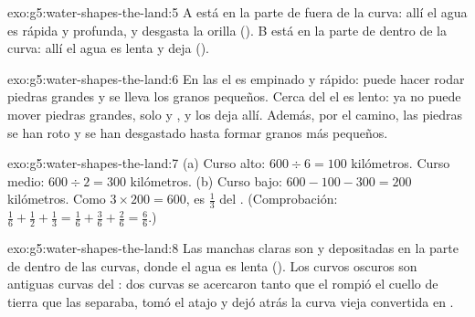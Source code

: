 \begin{solution}{exo:g5:water-shapes-the-land:5}
A está en la parte de fuera de la curva: allí el agua es rápida y profunda,
y desgasta la orilla (). B está en la parte de dentro de la curva:
allí el agua es lenta y deja  ().
\end{solution}

\begin{solution}{exo:g5:water-shapes-the-land:6}
En las  el  es empinado y rápido: puede hacer rodar piedras
grandes y se lleva los granos pequeños. Cerca del  el  es lento: ya no
puede mover piedras grandes, solo  y , y los deja allí. Además,
por el camino, las piedras se han roto y se han desgastado hasta formar
granos más pequeños.
\end{solution}

\begin{solution}{exo:g5:water-shapes-the-land:7}
(a) Curso alto: $600 \div 6 = 100$ kilómetros. Curso medio:
$600 \div 2 = 300$ kilómetros. (b) Curso bajo: $600 - 100 - 300 = 200$
kilómetros. Como $3 \times 200 = 600$, es $\frac{1}{3}$ del .
(Comprobación: $\frac{1}{6} + \frac{1}{2} + \frac{1}{3} = \frac{1}{6} +
\frac{3}{6} + \frac{2}{6} = \frac{6}{6}$.)
\end{solution}

\begin{solution}{exo:g5:water-shapes-the-land:8}
Las manchas claras son  y  depositadas en la parte de dentro de
las curvas, donde el agua es lenta (). Los  curvos
oscuros son antiguas curvas del : dos curvas se acercaron tanto que el
 rompió el cuello de tierra que las separaba, tomó el atajo y dejó atrás
la curva vieja convertida en .
\end{solution}

